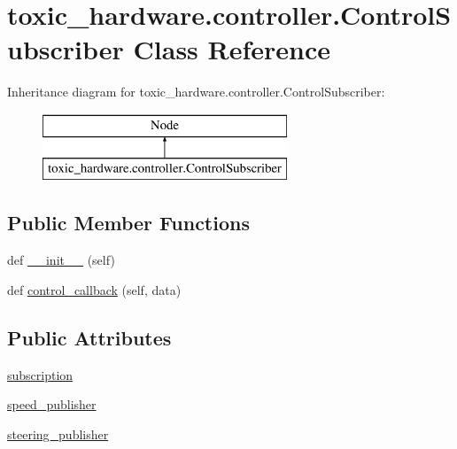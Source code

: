 \hypertarget{classtoxic__hardware_1_1controller_1_1ControlSubscriber}{}\section{toxic\+\_\+hardware.\+controller.\+Control\+Subscriber Class Reference}
\label{classtoxic__hardware_1_1controller_1_1ControlSubscriber}
Inheritance diagram for toxic\+\_\+hardware.\+controller.\+Control\+Subscriber\+:\begin{figure}[H]
\begin{center}
\leavevmode
\includegraphics[height=2.000000cm]{d0/d16/classtoxic__hardware_1_1controller_1_1ControlSubscriber}
\end{center}
\end{figure}
\subsection*{Public Member Functions}
\begin{DoxyCompactItemize}
\item 
def \mbox{\hyperlink{classtoxic__hardware_1_1controller_1_1ControlSubscriber_a4bfacc2feeb25a3f8bdd36a53f4603f6}{\+\_\+\+\_\+init\+\_\+\+\_\+}} (self)
\item 
def \mbox{\hyperlink{classtoxic__hardware_1_1controller_1_1ControlSubscriber_a5b6cbacda977aa6262f17de1211f43c2}{control\+\_\+callback}} (self, data)
\end{DoxyCompactItemize}
\subsection*{Public Attributes}
\begin{DoxyCompactItemize}
\item 
\mbox{\hyperlink{classtoxic__hardware_1_1controller_1_1ControlSubscriber_a40606153bdcf4badb2dc06f740fe38b3}{subscription}}
\item 
\mbox{\hyperlink{classtoxic__hardware_1_1controller_1_1ControlSubscriber_a3ea2bcdc2acf9a84d3456c69b813b7e2}{speed\+\_\+publisher}}
\item 
\mbox{\hyperlink{classtoxic__hardware_1_1controller_1_1ControlSubscriber_a08792ade789191d1c5015a4ad6478a40}{steering\+\_\+publisher}}
\end{DoxyCompactItemize}


